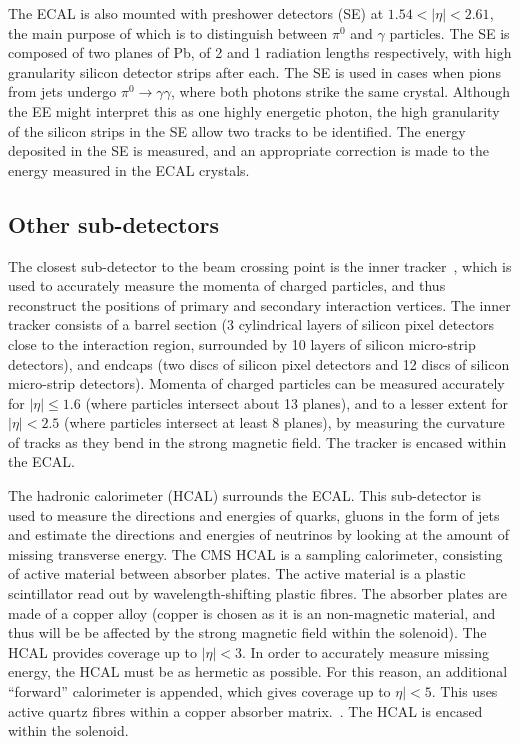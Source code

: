 \documentclass[10pt]{article}
\begin{document}
The ECAL is also mounted with preshower detectors (SE) at $1.54 <|\eta| < 2.61$, the main purpose of which is to distinguish between $\pi^0$ and $\gamma$ particles. The SE is composed of two planes of Pb, of 2 and 1 radiation lengths respectively, with high granularity silicon detector strips after each. The SE is used in cases when pions from jets undergo $\pi^0\rightarrow \gamma \gamma$, where both photons strike the same crystal. Although the EE might interpret this as one highly energetic photon, the high granularity of the silicon strips in the SE allow two tracks to be identified. The energy deposited in the SE is measured, and an appropriate correction is made to the energy measured in the ECAL crystals.

\subsection{Other sub-detectors}

The closest sub-detector to the beam crossing point is the inner tracker~\cite{cmsTrk}, which is used to accurately measure the momenta of charged particles, and thus reconstruct the positions of primary  and secondary interaction vertices. The inner tracker consists of a barrel section (3 cylindrical layers of silicon pixel detectors close to the interaction region, surrounded by 10 layers of silicon micro-strip detectors), and endcaps (two discs of silicon pixel detectors and 12 discs of silicon micro-strip detectors). Momenta of charged particles can be measured accurately for $|\eta|\leq 1.6$ (where particles intersect about 13 planes), and to a lesser extent for $|\eta| <2.5$ (where particles intersect at least 8 planes), by measuring the curvature of tracks as they bend in the strong magnetic field. The tracker is encased within the ECAL.

The hadronic calorimeter (HCAL) surrounds the ECAL. This sub-detector is used to measure the directions and energies of quarks, gluons in the form of jets and estimate the directions and energies of neutrinos by looking at the amount of missing transverse energy. The CMS HCAL is a sampling calorimeter, consisting of active material between absorber plates. The active material is a plastic scintillator read out by  wavelength-shifting plastic fibres. The absorber plates are made of a copper alloy (copper is chosen as it is an non-magnetic material, and thus will be be affected by the strong magnetic field within the solenoid). The HCAL provides coverage up to $|\eta| < 3$. In order to accurately measure missing energy, the HCAL must be as hermetic as possible. For this reason, an additional ``forward'' calorimeter is appended, which gives coverage up to $\eta| <5$. This uses active quartz fibres within a copper absorber matrix.~\cite{cmsHcal}. The HCAL is encased within the solenoid.
\end{document}
